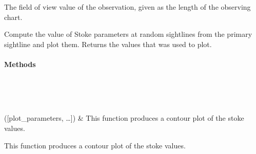 \documentclass[letterpaper,10pt,english]{sphinxmanual}
\begin{document}
\begin{fulllineitems}
\begin{fulllineitems}
\label{\detokenize{model_observing:model_observing.ObservingRun.self.field_of_view}}
 \textendash{} The field of view value of the observation, given as the length
of the observing chart.

\end{fulllineitems}



\begin{fulllineitems}
Compute the value of Stoke parameters at random sightlines from the
primary sightline and plot them. Returns the values that was used
to plot.

\end{fulllineitems}

\paragraph{Methods}


\begin{savenotes}\sphinxatlongtablestart\begin{longtable}{}
\hline

\endfirsthead

%
{}\\
\hline

\endhead

\hline
{}\\
\endfoot

\endlastfoot

{\hyperref[\detokenize{model_observing:model_observing.ObservingRun.Stokes_parameter_contours}]{}}({[}plot\_parameters, …{]})
&
This function produces a contour plot of the stoke values.
\\
\hline
\end{longtable}\sphinxatlongtableend\end{savenotes}

\begin{fulllineitems}
\label{\detokenize{model_observing:model_observing.ObservingRun.Stokes_parameter_contours}}
This function produces a contour plot of the stoke values.


\end{fulllineitems}
\end{fulllineitems}
\end{document}
